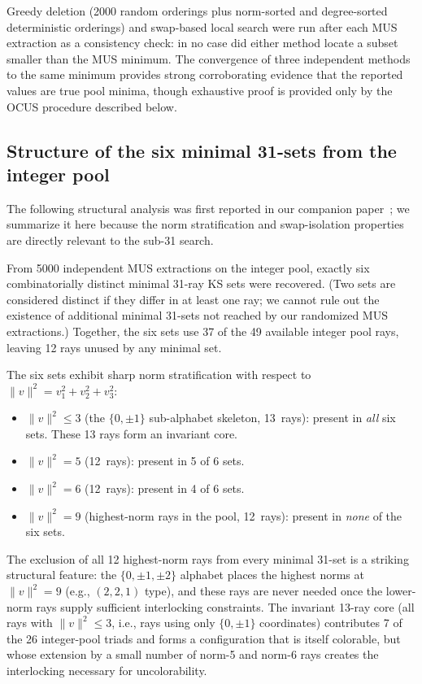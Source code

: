 \documentclass[twocolumn,pra,superscriptaddress,nofootinbib]{revtex4-2}
\begin{document}
Greedy deletion (2000 random orderings plus norm-sorted and degree-sorted
deterministic orderings) and swap-based local search were run after each MUS
extraction as a consistency check: in no case did either method locate a subset
smaller than the MUS minimum. The convergence of three independent methods to
the same minimum provides strong corroborating evidence that the reported
values are true pool minima, though exhaustive proof is provided only by the
OCUS procedure described below.

\subsection{Structure of the six minimal 31-sets from the integer pool}

The following structural analysis was first reported in our companion
paper~\cite{Kernaghan2026algebraic}; we summarize it here because the norm
stratification and swap-isolation properties are directly relevant to the
sub-31 search.

From 5000 independent MUS extractions on the integer pool, exactly six
combinatorially distinct minimal 31-ray KS sets were recovered. (Two sets are
considered distinct if they differ in at least one ray; we cannot rule out the
existence of additional minimal 31-sets not reached by our randomized MUS
extractions.) Together, the six sets use 37 of the 49 available integer pool
rays, leaving 12 rays unused by any minimal set.

The six sets exhibit sharp norm stratification with respect to $\|v\|^2 =
v_1^2 + v_2^2 + v_3^2$:
\begin{itemize}
\item $\|v\|^2 \leq 3$ (the $\{0,\pm1\}$ sub-alphabet skeleton, 13~rays):
  present in \emph{all} six sets. These 13 rays form an invariant core.
\item $\|v\|^2 = 5$ (12~rays): present in 5 of 6 sets.
\item $\|v\|^2 = 6$ (12~rays): present in 4 of 6 sets.
\item $\|v\|^2 = 9$ (highest-norm rays in the pool, 12~rays): present in
  \emph{none} of the six sets.
\end{itemize}

The exclusion of all 12 highest-norm rays from every minimal 31-set is a
striking structural feature: the $\{0,\pm1,\pm2\}$ alphabet places the highest
norms at $\|v\|^2 = 9$ (e.g., $(2,2,1)$ type), and these rays are never
needed once the lower-norm rays supply sufficient interlocking constraints. The
invariant 13-ray core (all rays with $\|v\|^2 \leq 3$, i.e., rays using only
$\{0,\pm1\}$ coordinates) contributes 7 of the 26 integer-pool triads and forms
a configuration that is itself colorable, but whose extension by a small number
of norm-5 and norm-6 rays creates the interlocking necessary for
uncolorability.
\end{document}
